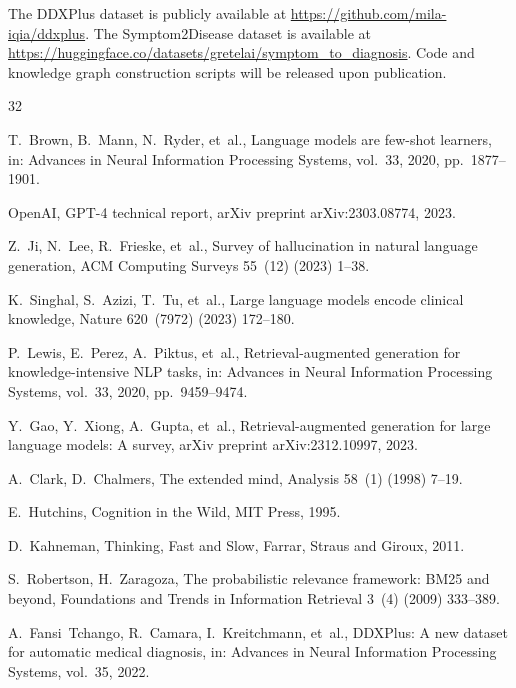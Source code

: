 \documentclass[preprint,12pt]{elsarticle}
\begin{document}
The DDXPlus dataset is publicly available at \url{https://github.com/mila-iqia/ddxplus}. The Symptom2Disease dataset is available at \url{https://huggingface.co/datasets/gretelai/symptom_to_diagnosis}. Code and knowledge graph construction scripts will be released upon publication.



\begin{thebibliography}{32}

T.~Brown, B.~Mann, N.~Ryder, et~al., Language models are few-shot learners, in: Advances in Neural Information Processing Systems, vol.~33, 2020, pp.~1877--1901.

OpenAI, GPT-4 technical report, arXiv preprint arXiv:2303.08774, 2023.

Z.~Ji, N.~Lee, R.~Frieske, et~al., Survey of hallucination in natural language generation, ACM Computing Surveys 55~(12) (2023) 1--38.

K.~Singhal, S.~Azizi, T.~Tu, et~al., Large language models encode clinical knowledge, Nature 620~(7972) (2023) 172--180.

P.~Lewis, E.~Perez, A.~Piktus, et~al., Retrieval-augmented generation for knowledge-intensive NLP tasks, in: Advances in Neural Information Processing Systems, vol.~33, 2020, pp.~9459--9474.

Y.~Gao, Y.~Xiong, A.~Gupta, et~al., Retrieval-augmented generation for large language models: A survey, arXiv preprint arXiv:2312.10997, 2023.

A.~Clark, D.~Chalmers, The extended mind, Analysis 58~(1) (1998) 7--19.

E.~Hutchins, Cognition in the Wild, MIT Press, 1995.

D.~Kahneman, Thinking, Fast and Slow, Farrar, Straus and Giroux, 2011.

S.~Robertson, H.~Zaragoza, The probabilistic relevance framework: BM25 and beyond, Foundations and Trends in Information Retrieval 3~(4) (2009) 333--389.

A.~Fansi~Tchango, R.~Camara, I.~Kreitchmann, et~al., DDXPlus: A new dataset for automatic medical diagnosis, in: Advances in Neural Information Processing Systems, vol.~35, 2022.


\end{thebibliography}
\end{document}
